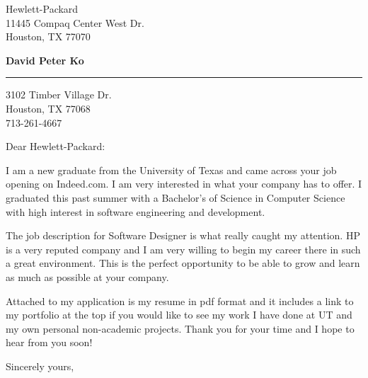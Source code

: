 \documentclass{letter} %
\begin{document}
\signature{David Peter Ko}           %
\longindentation=0pt                       %
\let\raggedleft\raggedright                %
 
 
\begin{letter}{Hewlett-Packard \\
11445 Compaq Center West Dr. \\
Houston, TX 77070 }


\begin{center}
{\large\bf David Peter Ko} 
\end{center}
\medskip\hrule height 1pt
\begin{center}
{3102 Timber Village Dr. \\  Houston, TX 77068 \\ 713-261-4667} 
\end{center} \vfill %
 
 
\opening{Dear Hewlett-Packard:} 
 
\noindent I am a new graduate from the University of Texas and came across your job opening on Indeed.com. I am very interested in what your company has to offer. I graduated this past summer with a Bachelor's of Science in Computer Science with high interest in software engineering and development. 
 
\noindent The job description for Software Designer is what really caught my attention. HP is a very reputed company and I am very willing to begin my career there in such a great environment. This is the perfect opportunity to be able to grow and learn as much as possible at your company.  
 
\noindent Attached to my application is my resume in pdf format and it includes a link to my portfolio at the top if you would like to see my work I have done at UT and my own personal non-academic projects. Thank you for your time and I hope to hear from you soon! 
 
\closing{Sincerely yours,} 
 

 

\end{letter}
 
\end{document}

